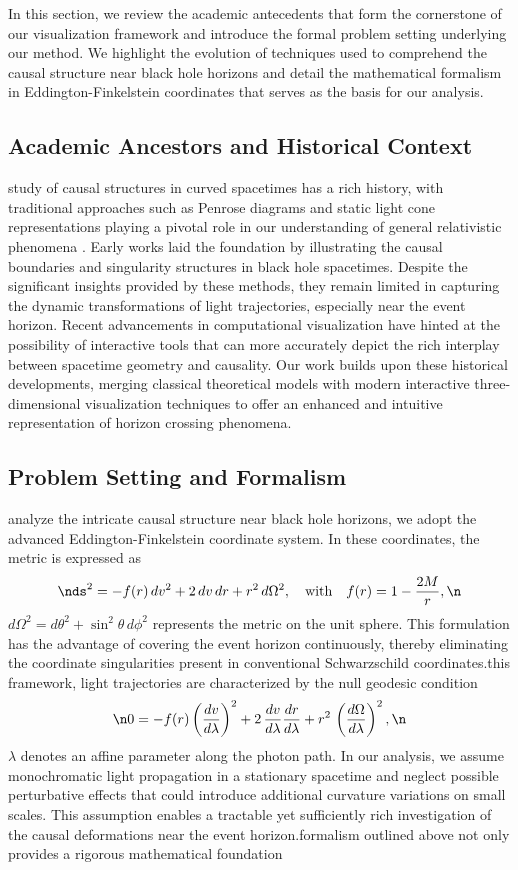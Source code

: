 \documentclass{article}
\begin{document}
In this section, we review the academic antecedents that form the cornerstone of our visualization framework and introduce the formal problem setting underlying our method. We highlight the evolution of techniques used to comprehend the causal structure near black hole horizons and detail the mathematical formalism in Eddington-Finkelstein coordinates that serves as the basis for our analysis.\n\n\subsection{Academic Ancestors and Historical Context}\nThe study of causal structures in curved spacetimes has a rich history, with traditional approaches such as Penrose diagrams and static light cone representations playing a pivotal role in our understanding of general relativistic phenomena \cite{ref1}. Early works laid the foundation by illustrating the causal boundaries and singularity structures in black hole spacetimes. Despite the significant insights provided by these methods, they remain limited in capturing the dynamic transformations of light trajectories, especially near the event horizon. Recent advancements in computational visualization have hinted at the possibility of interactive tools that can more accurately depict the rich interplay between spacetime geometry and causality. Our work builds upon these historical developments, merging classical theoretical models with modern interactive three-dimensional visualization techniques to offer an enhanced and intuitive representation of horizon crossing phenomena.\n\n\subsection{Problem Setting and Formalism}\nTo analyze the intricate causal structure near black hole horizons, we adopt the advanced Eddington-Finkelstein coordinate system. In these coordinates, the metric is expressed as\n\begin{equation}\nds^2 = -f(r)\, dv^2 + 2\, dv\, dr + r^2\, d\Omega^2, \quad \text{with} \quad f(r)=1-\frac{2M}{r},\n\end{equation}\nwhere \(d\Omega^2 = d\theta^2+\sin^2\theta\, d\phi^2\) represents the metric on the unit sphere. This formulation has the advantage of covering the event horizon continuously, thereby eliminating the coordinate singularities present in conventional Schwarzschild coordinates.\n\nWithin this framework, light trajectories are characterized by the null geodesic condition\n\begin{equation}\n0 = -f(r)\left(\frac{dv}{d\lambda}\right)^2 + 2\,\frac{dv}{d\lambda}\frac{dr}{d\lambda} + r^2\,\left(\frac{d\Omega}{d\lambda}\right)^2, \label{eq:nullgeodesic}\n\end{equation}\nwhere \(\lambda\) denotes an affine parameter along the photon path. In our analysis, we assume monochromatic light propagation in a stationary spacetime and neglect possible perturbative effects that could introduce additional curvature variations on small scales. This assumption enables a tractable yet sufficiently rich investigation of the causal deformations near the event horizon.\n\nThe formalism outlined above not only provides a rigorous mathematical foundation 
\end{document}
